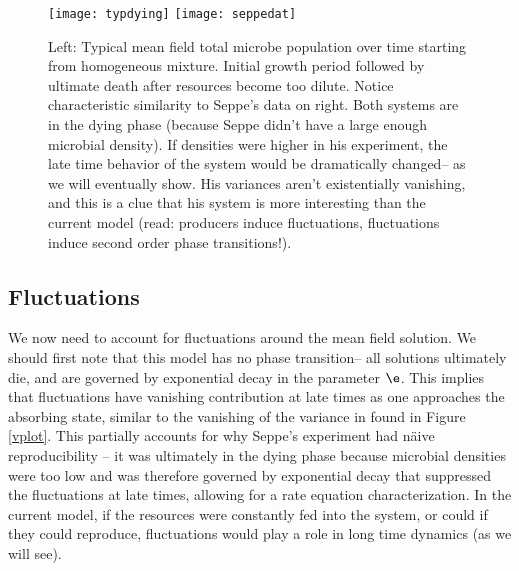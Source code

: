 \documentclass[aps,prx,groupedaddress,notitlepage]{revtex4-1} %
\begin{document}
\begin{figure}[t]
	\centering
	\texttt{[image: typdying]} \hspace{1cm}\texttt{[image: seppedat]}
	\caption{Left: Typical mean field total microbe population over time starting from homogeneous mixture. Initial growth period followed by ultimate death after resources become too dilute. Notice characteristic similarity to Seppe's data on right. Both systems are in the dying phase (because Seppe didn't have a large enough microbial density). If densities were higher in his experiment, the late time behavior of the system would be dramatically changed-- as we will eventually show. His variances aren't existentially vanishing, and this is a clue that his system is more interesting than the current model (read: producers induce fluctuations, fluctuations induce second order phase transitions!). } \label{dieplot}
\end{figure}
\subsection{Fluctuations}
We now need to account for fluctuations around the mean field solution. We should first note that this model has no phase transition--  all solutions ultimately die, and are governed by exponential decay in the parameter $\e$. This implies that fluctuations have vanishing contribution at late times as one approaches the absorbing state, similar to the vanishing of the variance in found in Figure \ref{vplot}. This partially accounts for why Seppe's experiment had n\"aive reproducibility -- it was ultimately in the dying phase because microbial densities were too low and was therefore governed by exponential decay that suppressed the fluctuations at late times, allowing for a rate equation characterization. In the current model, if the resources were constantly fed into the system, or could if they could reproduce, fluctuations would play a role in long time dynamics (as we will see).
\end{document}

